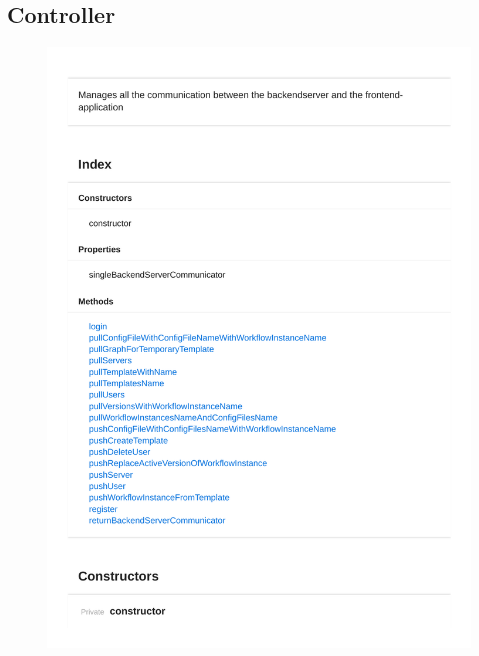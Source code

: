 \subsection{Controller}
\begin{figure}[H]
\centerline{\includegraphics[width=\textwidth]{FrontendDocsAsPDF/Controller/BackendServerCommunicator.pdf}}
\end{figure}

